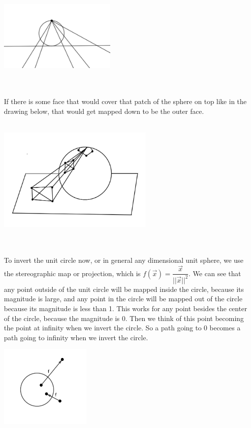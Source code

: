 \documentclass{article}
\begin{document}
\centerline{\includegraphics[width=2.25in]{Images/Homeomorphism.png}}
\\\\
If there is some face that would cover that patch of the sphere on top like in the drawing below, that would get mapped down to be the outer face.
\\\\
\centerline{\includegraphics[width=3in]{Images/outerfaceonsphere.JPG}}
\\\\
To invert the unit circle now, or in general any dimensional unit sphere, we use the stereographic map or projection, which is $f(\vec{x})=\dfrac{\vec{x}}{||\vec{x}||^2}$. We can see that any point outside of the unit circle will be mapped inside the circle, because its magnitude is large, and any point in the circle will be mapped out of the circle because its magnitude is less than 1. This works for any point besides the center of the circle, because the magnitude is 0. Then we think of this point becoming the point at infinity when we invert the circle. So a path going to 0 becomes a path going to infinity when we invert the circle.\\
\centerline{\includegraphics[width=1.75in]{Images/Stereographic.png}}
\end{document}
